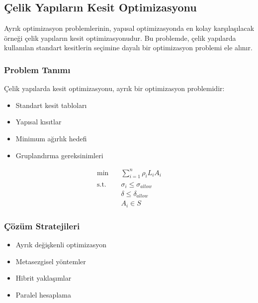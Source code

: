 
\subsection{Çelik Yapıların Kesit Optimizasyonu}
Ayrık optimizasyon problemlerinin, yapısal optimizasyonda en kolay karşılaşılacak örneği çelik yapıların kesit optimizasyonudur. Bu problemde, çelik yapılarda kullanılan standart kesitlerin seçimine dayalı bir optimizasyon problemi ele alınır.

\subsubsection{Problem Tanımı}
Çelik yapılarda kesit optimizasyonu, ayrık bir optimizasyon problemidir:
\begin{itemize}
    \item Standart kesit tabloları
    \item Yapısal kısıtlar
    \item Minimum ağırlık hedefi
    \item Gruplandırma gereksinimleri
\end{itemize}

\begin{equation}
\begin{aligned}
\min & \quad \sum_{i=1}^n \rho_i L_i A_i \\
\text{s.t.} & \quad \sigma_i \leq \sigma_{allow} \\
& \quad \delta \leq \delta_{allow} \\
& \quad A_i \in S
\end{aligned}
\end{equation}


\subsubsection{Çözüm Stratejileri}
\begin{itemize}
    \item Ayrık değişkenli optimizasyon
    \item Metasezgisel yöntemler
    \item Hibrit yaklaşımlar
    \item Paralel hesaplama
\end{itemize}

